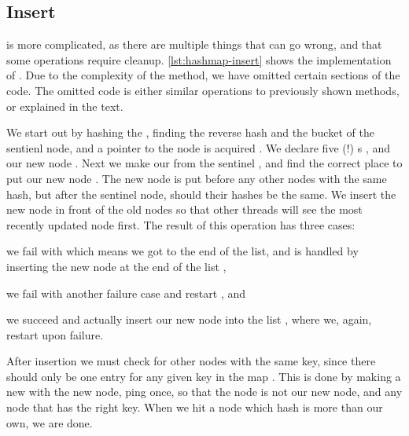 \subsection{Insert}
 is more complicated, as there are multiple things that can go wrong, and
that some operations require cleanup. \cref{lst:hashmap-insert} shows the implementation of
. Due to the complexity of the method, we have omitted certain sections of the code.
The omitted code is either similar operations to previously shown methods, or explained in the
text.



We start out by hashing the , finding the reverse hash  and the bucket of
the sentienl node, and a pointer to the node is acquired . We declare five (!)
s , and  our new node .
Next we make our  from the sentinel , and find the correct place to put
our new node . The new node is put before any other nodes with the same hash, but
after the sentinel node, should their hashes be the same. We insert the new node in front of the
old nodes so that other threads will see the most recently updated node first. The result of this
operation has three cases:
\begin{enumerate*}[1) ]
  \item we fail with  which means we got to the end of the list, and is handled by
    inserting the new node at the end of the list  ,
  \item we fail with another failure case and restart , and
  \item we succeed and actually insert our new node into the list , where we, again,
    restart upon failure.
\end{enumerate*}

After insertion we must check for other nodes with the same key, since there should only be one
entry for any given key in the map . This is done by making a new  with
the new node, ping once, so that the  node is not our new node, and
 any node that has the right key.  When we hit a node which hash is more than our
own, we are done.
